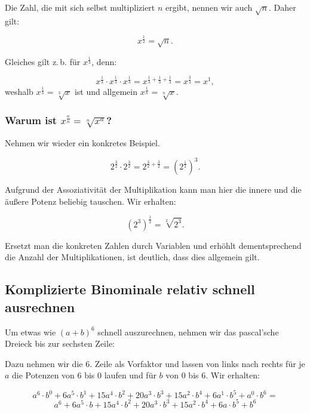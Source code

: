 \documentclass{scrartcl}
\begin{document}
Die Zahl, die mit sich selbst multipliziert $n$ ergibt, nennen wir auch $\sqrt{n}$. Daher gilt:

\begin{equation}
	x^\frac{1}{2} = \sqrt{n}.
\end{equation}

Gleiches gilt z.\,b. für $x^\frac{1}{3}$, denn:

\begin{equation}
	x^\frac{1}{3} \cdot x^\frac{1}{3} \cdot x^\frac{1}{3} = x^{\frac{1}{3} + \frac{1}{3} + \frac{1}{3}} = x^\frac{3}{3} = x^1,
\end{equation}
weshalb $x^\frac{1}{3} = \sqrt[3]{x}$ ist und allgemein $x^\frac{1}{n} = \sqrt[n]{x}$.

\subsubsection{Warum ist $x^\frac{a}{n} = \sqrt[n]{x^a}$?}

Nehmen wir wieder ein konkretes Beispiel.

\begin{equation}
	2^\frac{3}{2} \cdot 2^\frac{3}{2} = 2^{\frac{3}{2} + \frac{3}{2}} = \left(2^{\frac{1}{2}}\right)^3.
\end{equation}

Aufgrund der Assoziativität der Multiplikation kann man hier die innere und die äußere Potenz beliebig tauschen.
Wir erhalten:

\begin{equation}
	\left(2^3\right)^\frac{1}{2} = \sqrt[2]{2^3}.
\end{equation}


Ersetzt man die konkreten Zahlen durch Variablen und erhöhlt dementsprechend die
Anzahl der Multiplikationen, ist deutlich, dass dies allgemein gilt.

\subsection{Komplizierte Binominale relativ schnell ausrechnen}

Um etwas wie $(a + b)^6$ schnell auszurechnen, nehmen wir das pascal'sche Dreieck bis zur sechsten Zeile:



Dazu nehmen wir die 6. Zeile als Vorfaktor und lassen von links nach rechts für je $a$ die Potenzen von 6 bis
0 laufen und für $b$ von 0 bis 6. Wir erhalten:

\begin{equation}
	a^6\cdot b^0 + 6a^5\cdot b^1 + 15a^4\cdot b^2 + 20a^3\cdot b^3 + 15a^2\cdot b^4 + 6a^1\cdot b^5 + a^0\cdot b^6 =
\end{equation}
\begin{equation*}
	a^6 + 6a^5\cdot b + 15a^4\cdot b^2 + 20a^3\cdot b^3 + 15a^2\cdot b^4 + 6a\cdot b^5 + b^6
\end{equation*}
\end{document}

